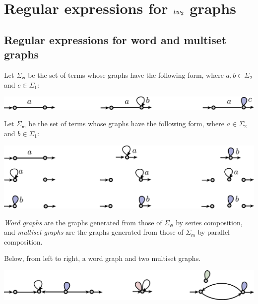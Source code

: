 \section{Regular expressions for $\TWT$ graphs}\label{sec:reg-exp}


\subsection{Regular expressions for word and multiset graphs}
\begin{definition}
Let $\Sigma_\mathsf{w}$ be the set of terms whose graphs have the following form, where $a,b\in \Sigma_2$ and $c\in \Sigma_1$:
\begin{center}
\includegraphics[scale=.37]{Pictures/word-alphabet}
\end{center}
Let $\Sigma_\mathsf{m}$ be the set of terms whose graphs have the following form, where $a\in \Sigma_2$ and $b\in \Sigma_1$:
\begin{center}
\includegraphics[scale=.35]{Pictures/multiset-alphabet}
\end{center}
 \emph{Word graphs} are the graphs generated from those of $\Sigma_\mathsf{w}$ by series composition,  and \emph{multiset graphs} are the graphs generated from those of $\Sigma_\mathsf{m}$ by parallel composition. 
\end{definition} 
\begin{example}
Below, from left to right, a word graph and two multiset graphs.
\begin{center}
\includegraphics[scale=.4]{Pictures/word-and-multiset-graphs}
\end{center}
\end{example}
